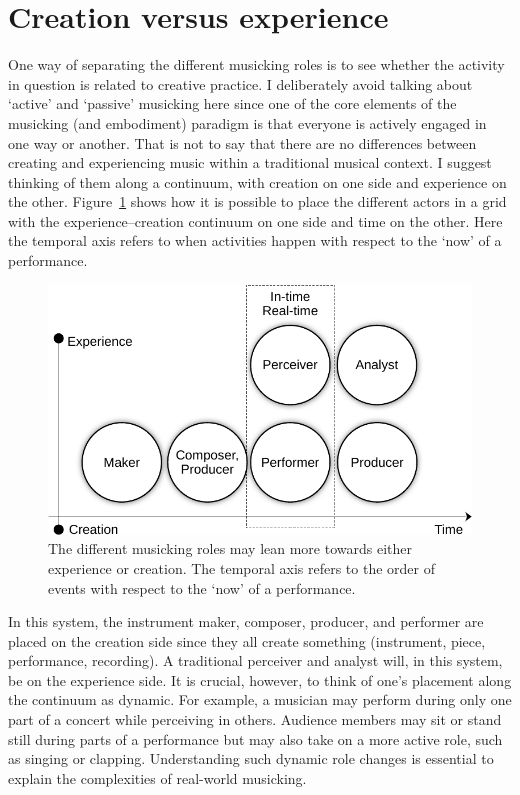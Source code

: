 \section{Creation versus experience}

One way of separating the different musicking roles is to see whether the activity in question is related to creative practice. I deliberately avoid talking about `active' and `passive' musicking here since one of the core elements of the musicking (and embodiment) paradigm is that everyone is actively engaged in one way or another. That is not to say that there are no differences between creating and experiencing music within a traditional musical context. I suggest thinking of them along a continuum, with creation on one side and experience on the other. Figure~\ref{fig:music-quadrant3} shows how it is possible to place the different actors in a grid with the experience--creation continuum on one side and time on the other. Here the temporal axis refers to when activities happen with respect to the `now' of a performance.

\begin{figure}[tp]
\includegraphics[width=\columnwidth]{figures/05-experience-creation-crop.pdf}
\caption{The different musicking roles may lean more towards either experience or creation. The temporal axis refers to the order of events with respect to the `now' of a performance.}
\label{fig:music-quadrant3}
\end{figure}

In this system, the instrument maker, composer, producer, and performer are placed on the creation side since they all create something (instrument, piece, performance, recording). A traditional perceiver and analyst will, in this system, be on the experience side. It is crucial, however, to think of one's placement along the continuum as dynamic. For example, a musician may perform during only one part of a concert while perceiving in others. Audience members may sit or stand still during parts of a performance but may also take on a more active role, such as singing or clapping. Understanding such dynamic role changes is essential to explain the complexities of real-world musicking.


